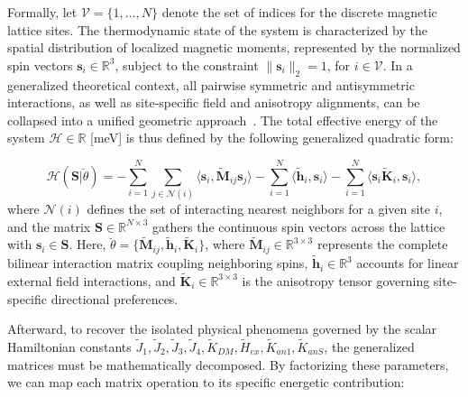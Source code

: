 \documentclass[letterpaper, 12, one column]{article}
\begin{document}
Formally, let $\mathcal{V} = \{1, \dots, N\}$ denote the set of indices for the discrete magnetic lattice sites. The thermodynamic state of the system is characterized by the spatial distribution of localized magnetic moments, represented by the normalized spin vectors $\mathbf{s}_i \in \mathbb{R}^3$, subject to the constraint 
$\|\mathbf{s}_i\|_2 = 1$, for $i\in\mathcal{V}$. In a generalized theoretical context, all pairwise symmetric and antisymmetric interactions, as well as site-specific field and anisotropy alignments, can be collapsed into a unified geometric approach~\cite{moriya1960anisotropic,eriksson2017atomistic}. The total effective energy of the system $\mathcal{H}\in\mathbb{R}$ [meV] is thus defined by the following generalized quadratic form:

\begin{equation}\label{eq:GeneralizedHamiltonian}
\mathcal{H}\left(\mathbf{S}| \breve{\theta}\right) = 
- \sum_{i=1}^{N}\sum_{j\in \mathcal{N}(i)} 
    \langle \mathbf{s}_i, \tilde{\mathbf{M}}_{ij}\mathbf{s}_j \rangle
- \sum_{i=1}^{N} \langle\tilde{\mathbf{h}}_{i},\mathbf{s}_i\rangle 
- \sum_{i=1}^{N} \langle\mathbf{s}_i \tilde{\mathbf{K}}_i, 
    \mathbf{s}_i\rangle,
\end{equation}
where $\mathcal{N}(i)$ defines the set of interacting nearest neighbors for a given site $i$, and the matrix $\mathbf{S}\in\mathbb{R}^{N\times 3}$ 
gathers the continuous spin vectors across the lattice with 
$\mathbf{s}_i\in\mathbf{S}$. Here, 
$\breve{\theta}=\{\tilde{\mathbf{M}}_{ij},\tilde{\mathbf{h}}_{i},
\tilde{\mathbf{K}}_{i}\}$, where 
$\tilde{\mathbf{M}}_{ij} \in \mathbb{R}^{3 \times 3}$ represents the complete bilinear interaction matrix coupling neighboring spins, $\tilde{\mathbf{h}}_i \in \mathbb{R}^{3}$ accounts for linear external field interactions, and $\tilde{\mathbf{K}}_i \in \mathbb{R}^{3 \times 3}$ 
is the anisotropy tensor governing site-specific directional preferences.

Afterward, to recover the isolated physical phenomena governed by the scalar Hamiltonian constants
$\tilde{J}_1,\tilde{J}_2,\tilde{J}_3,\tilde{J}_4,\tilde{K}_{DM},\tilde{H}_{ex},\tilde{K}_{an1},\tilde{K}_{anS}$, the generalized matrices must be mathematically decomposed. By factorizing these parameters, we can map each matrix operation to its specific energetic contribution:
\end{document}
